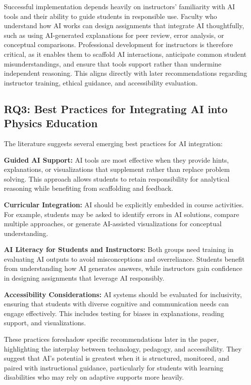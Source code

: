 \documentclass[]{aastex701}
\begin{document}
Successful implementation depends heavily on instructors' familiarity with AI tools and their ability to guide students in responsible use. Faculty who understand how AI works can design assignments that integrate AI thoughtfully, such as using AI-generated explanations for peer review, error analysis, or conceptual comparisons. Professional development for instructors is therefore critical, as it enables them to scaffold AI interactions, anticipate common student misunderstandings, and ensure that tools support rather than undermine independent reasoning. This aligns directly with later recommendations regarding instructor training, ethical guidance, and accessibility evaluation.


\subsection{RQ3: Best Practices for Integrating AI into Physics Education}

The literature suggests several emerging best practices for AI integration:

\textbf{Guided AI Support:} AI tools are most effective when they provide hints, explanations, or visualizations that supplement rather than replace problem solving. This approach allows students to retain responsibility for analytical reasoning while benefiting from scaffolding and feedback.

\textbf{Curricular Integration:} AI should be explicitly embedded in course activities. For example, students may be asked to identify errors in AI solutions, compare multiple approaches, or generate AI-assisted visualizations for conceptual understanding.


\textbf{AI Literacy for Students and Instructors:} Both groups need training in evaluating AI outputs to avoid misconceptions and overreliance. Students benefit from understanding how AI generates answers, while instructors gain confidence in designing assignments that leverage AI responsibly.


\textbf{Accessibility Considerations:} AI systems should be evaluated for inclusivity, ensuring that students with diverse cognitive and communication needs can engage effectively. This includes testing for biases in explanations, reading support, and visualizations.


These practices foreshadow specific recommendations later in the paper, highlighting the interplay between technology, pedagogy, and accessibility. They suggest that AI's potential is greatest when it is structured, monitored, and paired with instructional guidance, particularly for students with learning disabilities who may rely on adaptive supports more heavily.
\end{document}
